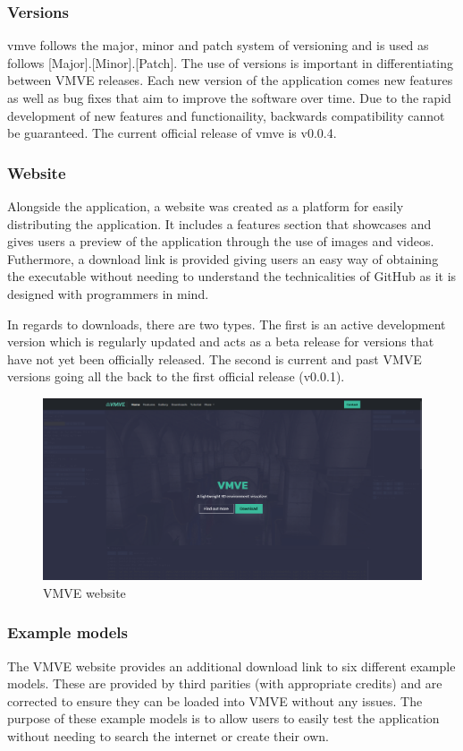 \documentclass[11pt]{article}
\begin{document}
\subsubsection{Versions}
\gls{vmve} follows the major, minor and patch system of versioning and is used
as follows [Major].[Minor].[Patch]. The use of versions is important in
differentiating between VMVE releases. Each new version of the application comes
new features as well as bug fixes that aim to improve the software over time.
Due to the rapid development of new features and functionaility, backwards
compatibility cannot be guaranteed. The current official release of \gls{vmve}
is v0.0.4.

\subsubsection{Website}
Alongside the application, a website was created as a platform for easily
distributing the application. It includes a features section that showcases and
gives users a preview of the application through the use of images and videos.
Futhermore, a download link is provided giving users an easy way of obtaining
the executable without needing to understand the technicalities of GitHub as it
is designed with programmers in mind.

In regards to downloads, there are two types. The first is an active development
version which is regularly updated and acts as a beta release for versions that
have not yet been officially released. The second is current and past VMVE versions
going all the back to the first official release (v0.0.1).

\begin{figure}[h!]
  \centering
  \includegraphics[width=\textwidth]{images/website.png}
  \caption{VMVE website}
  \label{fig:website}
\end{figure}


\subsubsection{Example models}
The VMVE website provides an additional download link to six different example
models. These are provided by third parities (with appropriate credits) and are
corrected to ensure they can be loaded into VMVE without any issues. The purpose
of these example models is to allow users to easily test the application without
needing to search the internet or create their own.
\end{document}

